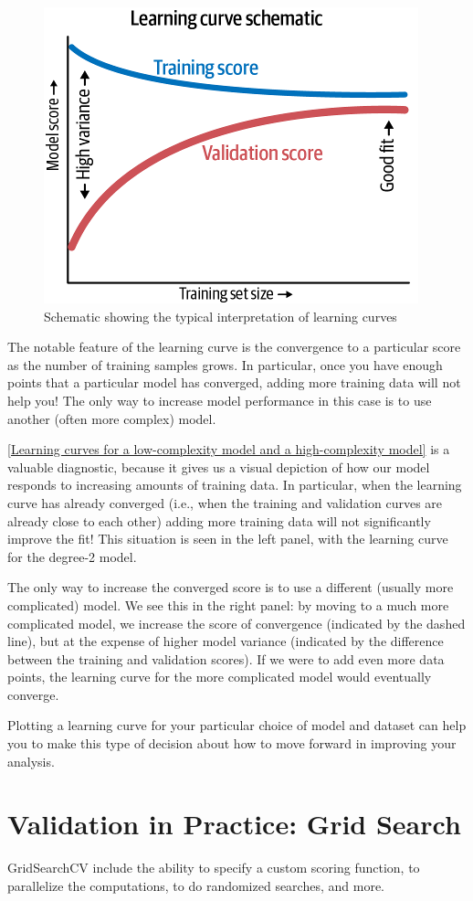 \begin{figure}
      \centering
      \includegraphics{../Figures/fig39-11.png}
      \caption{Schematic showing the typical interpretation of learning curves}
      \label{fig39-11}
\end{figure}

The notable feature of the learning curve is the convergence to a particular score as
the number of training samples grows. In particular, once you have enough points
that a particular model has converged, adding more training data will not help you!
The only way to increase model performance in this case is to use another (often
more complex) model.


\autoref{Learning curves for a low-complexity model and a high-complexity model} is a valuable diagnostic, because it gives us a visual depiction of how our model
responds to increasing amounts of training data. In particular, when the learning
curve has already converged (i.e., when the training and validation curves are already
close to each other) adding more training data will not significantly improve the fit!
This situation is seen in the left panel, with the learning curve for the degree-2 model.

The only way to increase the converged score is to use a different (usually more complicated) model. We see this in the right panel: by moving to a much more complicated model, we increase the score of convergence (indicated by the dashed line), but
at the expense of higher model variance (indicated by the difference between the
training and validation scores). If we were to add even more data points, the learning
curve for the more complicated model would eventually converge.

Plotting a learning curve for your particular choice of model and dataset can help you
to make this type of decision about how to move forward in improving your analysis.

\section{Validation in Practice: Grid Search}
GridSearchCV include the ability to specify a custom scoring function, to parallelize the computations, to do randomized searches, and more.